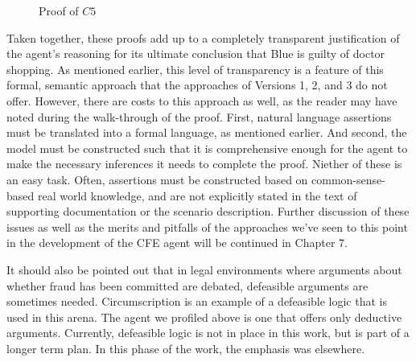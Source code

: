 \begin{figure}[h!] 
\vspace{6pt}
\centering
{}
\caption{Proof of $C5$}
\label{fig:proof_of_c5}
\end{figure}

Taken together, these proofs add up to a completely transparent justification of the agent's reasoning for its ultimate conclusion that Blue is guilty of doctor shopping.  As mentioned earlier, this level of transparency is a feature of this formal, semantic approach that the approaches of Versions 1, 2, and 3 do not offer.  However, there are costs to this approach as well, as the reader may have noted during the walk-through of the proof.  First, natural language assertions must be translated into a formal language, as mentioned earlier.  And second, the model must be constructed such that it is comprehensive enough for the agent to make the necessary inferences it needs to complete the proof.  Niether of these is an easy task.  Often, assertions must be constructed based on common-sense-based real world knowledge, and are not explicitly stated in the text of supporting documentation or the scenario description.  Further discussion of these issues as well as the merits and pitfalls of the approaches we've seen to this point in the development of the CFE agent will be continued in Chapter 7.

It should also be pointed out that in legal environments where arguments about whether fraud has been committed are debated, defeasible arguments \cite{nute2001defeasible} are sometimes needed.   Circumscription \cite{dimopoulos2002computational} is an example of a defeasible logic that is used in this arena.  The agent we profiled above is one that offers only deductive arguments.  Currently, defeasible logic is not in place in this work, but is part of a longer term plan. In this phase of the work, the emphasis was elsewhere.

